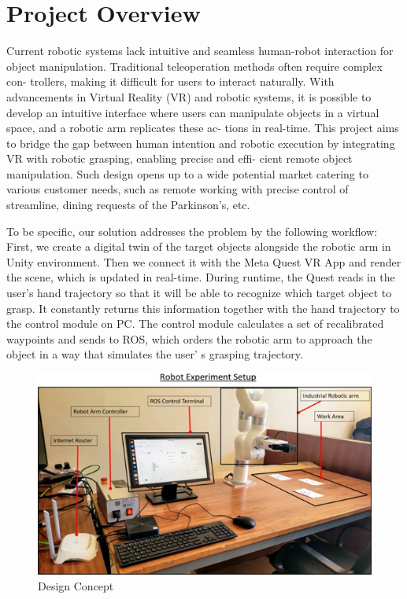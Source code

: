 \documentclass{senior-design-individual}
\begin{document}
\section{Project Overview}
Current robotic systems lack intuitive and seamless human-robot interaction for
object manipulation. Traditional teleoperation methods often require complex con-
trollers, making it difficult for users to interact naturally. With advancements in Virtual
Reality (VR) and robotic systems, it is possible to develop an intuitive interface where
users can manipulate objects in a virtual space, and a robotic arm replicates these ac-
tions in real-time. This project aims to bridge the gap between human intention and
robotic execution by integrating VR with robotic grasping, enabling precise and effi-
cient remote object manipulation. Such design opens up to a wide potential market
catering to various customer needs, such as remote working with precise control of
streamline, dining requests of the Parkinson's, etc.
 
To be specific, our solution addresses the problem by the following workflow:
First, we create a digital twin of the target objects alongside the robotic arm in Unity
environment. Then we connect it with the Meta Quest VR App and render the scene,
which is updated in real-time. During runtime, the Quest reads in the user's hand
trajectory so that it will be able to recognize which target object to grasp. It constantly
returns this information together with the hand trajectory to the control module on
PC. The control module calculates a set of recalibrated waypoints and sends to ROS,
which orders the robotic arm to approach the object in a way that simulates the user’
s grasping trajectory.
\begin{figure}[h]
    \centering
    \includegraphics[width=0.8\linewidth]{Robot Experiment Setup.png}
    \caption{Design Concept}
\end{figure}
\end{document}
